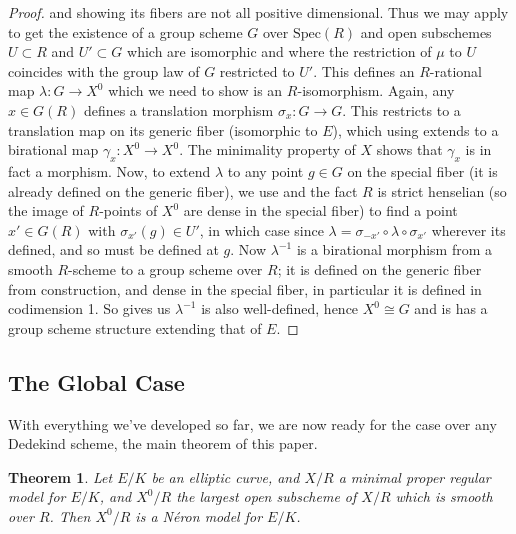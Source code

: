\documentclass{article}
\newtheorem{theorem}{Theorem}[section]
\theoremstyle{definition}
\theoremstyle{remark}
\theoremstyle{plain}
\begin{document}
\begin{proof}
and showing its fibers are not all positive dimensional.\newline
\indent Thus we may apply  to get the existence of a group scheme $G$ over $\text{Spec}(R)$ and open subschemes $U \subset R$ and $U' \subset G$ which are isomorphic and where the restriction of $\mu$ to $U$ coincides with the group law of $G$ restricted to $U'$.
This defines an $R$-rational map $\lambda: G \to X^0$ which we need to show is an $R$-isomorphism.
Again, any $x \in G(R)$ defines a translation morphism $\sigma_x: G \to G$.
This restricts to a translation map on its generic fiber (isomorphic to $E$), which using  extends to a birational map $\gamma_x: X^0 \to X^0$.
The minimality property of $X$ shows that $\gamma_x$ is in fact a morphism.
Now, to extend $\lambda$ to any point $g \in G$ on the special fiber (it is already defined on the generic fiber), we use  and the fact $R$ is strict henselian (so the image of $R$-points of $X^0$ are dense in the special fiber) to find a point $x' \in G(R)$ with $\sigma_{x'}(g) \in U'$, in which case since $\lambda = \sigma_{-x'} \circ \lambda \circ \sigma_{x'}$ wherever its defined, and so must be defined at $g$. 
Now $\lambda^{-1}$ is a birational morphism from a smooth $R$-scheme to a group scheme over $R$; it is defined on the generic fiber from construction, and dense in the special fiber, in particular it is defined in codimension 1.
So  gives us $\lambda^{-1}$ is also well-defined, hence $X^0 \cong G$ and is has a group scheme structure extending that of $E$. 
\end{proof}

\subsection{The Global Case}

With everything we've developed so far, we are now ready for the case over any Dedekind scheme, the main theorem of this paper.

\begin{theorem}\label{main-theorem}
	Let $E/K$ be an elliptic curve, and $X/R$ a minimal proper regular model for $E/K$, and $X^0/R$ the largest open subscheme of $X/R$ which is smooth over $R$.
	Then $X^0/R$ is a N\'eron model for $E/K$.
\end{theorem}
\end{document}
